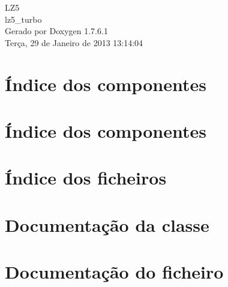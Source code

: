 \documentclass[a4paper]{book}
\begin{document}
\hypersetup{pageanchor=false,citecolor=blue}
\begin{titlepage}
\vspace*{7cm}
\begin{center}
{\Large \-L\-Z5 \\[1ex]\large lz5\-\_\-turbo }\\
\vspace*{1cm}
{\large \-Gerado por Doxygen 1.7.6.1}\\
\vspace*{0.5cm}
{\small Terça, 29 de Janeiro de 2013 13:14:04}\\
\end{center}
\end{titlepage}
\clearemptydoublepage
{}
\tableofcontents
\clearemptydoublepage
{}
\hypersetup{pageanchor=true,citecolor=blue}
\chapter{Índice dos componentes}

\chapter{Índice dos componentes}

\chapter{Índice dos ficheiros}

\chapter{\-Documentação da classe}






\chapter{\-Documentação do ficheiro}











\printindex
\end{document}
